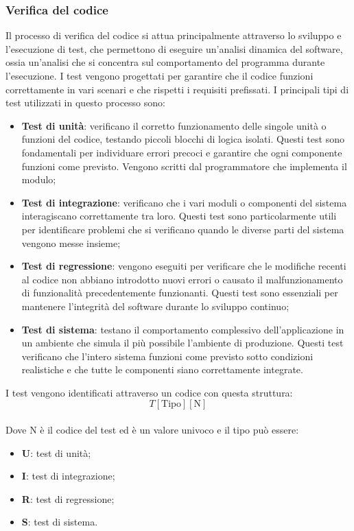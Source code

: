 \subsubsection{Verifica del codice}
Il processo di verifica del codice si attua principalmente attraverso lo
sviluppo e l'esecuzione di test, che permettono di eseguire un'analisi dinamica
del software, ossia un'analisi che si concentra sul comportamento del programma
durante l'esecuzione. I test vengono progettati per garantire che il codice
funzioni correttamente in vari scenari e che rispetti i requisiti prefissati. I
principali tipi di test utilizzati in questo processo sono:
\begin{itemize}
    \item \textbf{Test di unità}: verificano il corretto funzionamento delle singole unità o funzioni del codice, testando piccoli blocchi di logica isolati. Questi test sono fondamentali per individuare errori precoci e garantire che ogni componente funzioni come previsto. Vengono scritti dal programmatore che implementa il modulo;
    \item \textbf{Test di integrazione}: verificano che i vari moduli o componenti del sistema interagiscano correttamente tra loro. Questi test sono particolarmente utili per identificare problemi che si verificano quando le diverse parti del sistema vengono messe insieme;
    \item \textbf{Test di regressione}: vengono eseguiti per verificare che le modifiche recenti al codice non abbiano introdotto nuovi errori o causato il malfunzionamento di funzionalità precedentemente funzionanti. Questi test sono essenziali per mantenere l'integrità del software durante lo sviluppo continuo;
    \item \textbf{Test di sistema}: testano il comportamento complessivo dell'applicazione in un ambiente che simula il più possibile l'ambiente di produzione. Questi test verificano che l'intero sistema funzioni come previsto sotto condizioni realistiche e che tutte le componenti siano correttamente integrate.
\end{itemize}
I test vengono identificati attraverso un codice con questa struttura:
\textbf{
    \[
        T[\text{Tipo}][ \text{N}]
    \]
}
\\Dove N è il codice del test ed è un valore univoco e il tipo può essere:
\begin{itemize}
    \item \textbf{U}: test di unità;
    \item \textbf{I}: test di integrazione;
    \item \textbf{R}: test di regressione;
    \item \textbf{S}: test di sistema.
\end{itemize}

